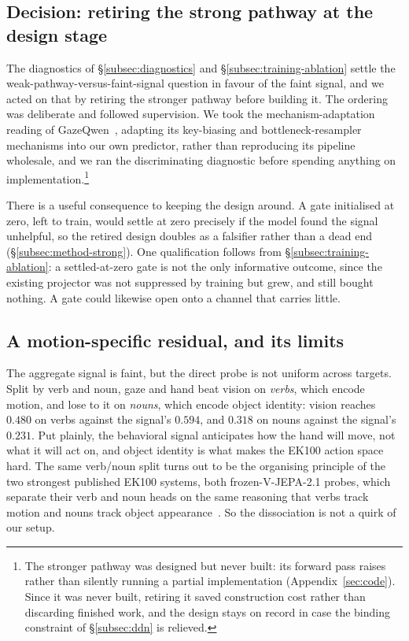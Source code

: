 \subsection{Decision: retiring the strong pathway at the design stage}
\label{subsec:b4}

The diagnostics of \S\ref{subsec:diagnostics} and
\S\ref{subsec:training-ablation} settle the weak-pathway-versus-faint-signal question in
favour of the faint signal, and we acted on that by retiring the stronger pathway
before building it. The ordering was deliberate and followed supervision. We took
the mechanism-adaptation reading of GazeQwen~\citep{pham2026gazeqwen}, adapting
its key-biasing and bottleneck-resampler mechanisms into our own predictor,
rather than reproducing its pipeline wholesale, and we ran the discriminating
diagnostic before spending anything on implementation.\footnote{The stronger
pathway was designed but never built: its forward pass raises rather than
silently running a partial implementation (Appendix~\ref{sec:code}). Since it was
never built, retiring it saved construction cost rather than discarding finished
work, and the design stays on record in case the binding constraint of
\S\ref{subsec:ddn} is relieved.}

There is a useful consequence to keeping the design around. A gate initialised at zero, left to train, would settle at zero
precisely if the model found the signal unhelpful, so the retired design doubles
as a falsifier rather than a dead end (\S\ref{subsec:method-strong}). One
qualification follows from \S\ref{subsec:training-ablation}: a settled-at-zero
gate is not the only informative outcome, since the existing projector was not
suppressed by training but grew, and still bought nothing. A gate could likewise
open onto a channel that carries little.

\subsection{A motion-specific residual, and its limits}
\label{subsec:dissociation}

The aggregate signal is faint, but the direct probe is not uniform across
targets. Split by verb and noun, gaze and hand beat vision on \emph{verbs}, which
encode motion, and lose to it on \emph{nouns}, which encode object identity:
vision reaches $0.480$ on verbs against the signal's $0.594$, and $0.318$ on
nouns against the signal's $0.231$. Put plainly, the behavioral signal anticipates
how the hand will move, not what it will act on, and object identity is what makes
the EK100 action space hard. The same verb/noun split turns out to be the
organising principle of the two strongest published EK100 systems, both
frozen-V-JEPA-2.1 probes, which separate their verb and noun heads on the same
reasoning that verbs track motion and nouns track object
appearance~\citep{chu2026jfaa, wang2026tapjepa}. So the dissociation is not a
quirk of our setup.


